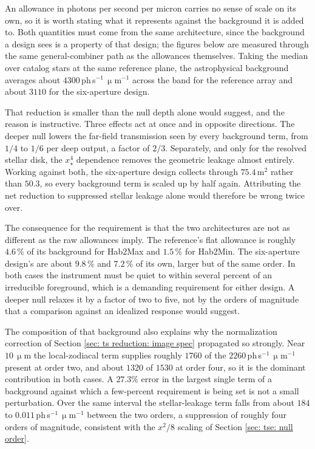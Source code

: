 \documentclass[12pt,a4paper]{article}
\numberwithin{equation}{section}
\numberwithin{figure}{section}
\numberwithin{table}{section}
\begin{document}
An allowance in photons per second per micron carries no sense of scale on its own, so it is worth stating what it represents against the background it is added to. Both quantities must come from the same architecture, since the background a design sees is a property of that design; the figures below are measured through the same general-combiner path as the allowances themselves. Taking the median over catalog stars at the same reference plane, the astrophysical background averages about $4300$\,ph\,s$^{-1}$\,$\upmu$m$^{-1}$ across the band for the reference array and about $3110$ for the six-aperture design.

That reduction is smaller than the null depth alone would suggest, and the reason is instructive. Three effects act at once and in opposite directions. The deeper null lowers the far-field transmission seen by every background term, from $1/4$ to $1/6$ per deep output, a factor of $2/3$. Separately, and only for the resolved stellar disk, the $x_\star^4$ dependence removes the geometric leakage almost entirely. Working against both, the six-aperture design collects through $75.4$\,m$^2$ rather than $50.3$, so every background term is scaled up by half again. Attributing the net reduction to suppressed stellar leakage alone would therefore be wrong twice over.

The consequence for the requirement is that the two architectures are not as different as the raw allowances imply. The reference's flat allowance is roughly $4.6\,\%$ of its background for Hab2Max and $1.5\,\%$ for Hab2Min. The six-aperture design's are about $9.8\,\%$ and $7.2\,\%$ of its own, larger but of the same order. In both cases the instrument must be quiet to within several percent of an irreducible foreground, which is a demanding requirement for either design. A deeper null relaxes it by a factor of two to five, not by the orders of magnitude that a comparison against an idealized response would suggest.

The composition of that background also explains why the normalization correction of Section \ref{sec: ts reduction: image spec} propagated so strongly. Near $10\,\upmu$m the local-zodiacal term supplies roughly $1760$ of the $2260$\,ph\,s$^{-1}$\,$\upmu$m$^{-1}$ present at order two, and about $1320$ of $1530$ at order four, so it is the dominant contribution in both cases. A $27.3\%$ error in the largest single term of a background against which a few-percent requirement is being set is not a small perturbation. Over the same interval the stellar-leakage term falls from about $184$ to $0.011$\,ph\,s$^{-1}$\,$\upmu$m$^{-1}$ between the two orders, a suppression of roughly four orders of magnitude, consistent with the $x^2/8$ scaling of Section \ref{sec: tse: null order}.
\end{document}
